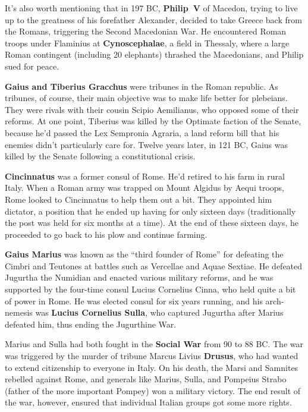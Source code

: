 It's also worth mentioning that in 197 BC, \textbf{Philip~V} of Macedon,
trying to live up to the greatness of his forefather Alexander,
decided to take Greece back from the Romans,
triggering the Second Macedonian War.
He encountered Roman troops under Flaminius at \textbf{Cynoscephalae}, a field in Thessaly,
where a large Roman contingent (including 20 elephants) thrashed the Macedonians,
and Philip sued for peace.

\textbf{Gaius and Tiberius Gracchus} were tribunes in the Roman republic.
As tribunes, of course, their main objective was to make life better for plebeians.
They were rivals with their cousin Scipio Aemilianus, who opposed some of their reforms.
At one point, Tiberius was killed by the Optimate faction of the Senate,
because he'd passed the Lex Sempronia Agraria,
a land reform bill that his enemies didn't particularly care for.
Twelve years later, in 121 BC, Gaius was killed by the Senate following a constitutional crisis.

\textbf{Cincinnatus} was a former consul of Rome.
He'd retired to his farm in rural Italy.
When a Roman army was trapped on Mount Algidus by Aequi troops,
Rome looked to Cincinnatus to help them out a bit.
They appointed him dictator, a position that he ended up having for only sixteen days
(traditionally the post was held for six months at a time).
At the end of these sixteen days, he proceeded to go back to his plow and continue farming.

\textbf{Gaius Marius} was known as the ``third founder of Rome''
for defeating the Cimbri and Teutones at battles such as Vercellae and Aquae Sextiae.
He defeated Jugurtha the Numidian and enacted various military reforms,
and he was supported by the four-time consul Lucius Cornelius Cinna,
who held quite a bit of power in Rome.
He was elected consul for six years running, and his arch-nemesis was
\textbf{Lucius Cornelius Sulla}, who captured Jugurtha after Marius defeated him,
thus ending the Jugurthine War.

Marius and Sulla had both fought in the \textbf{Social War} from 90 to 88 BC\@.
The war was triggered by the murder of tribune Marcus Livius \textbf{Drusus},
who had wanted to extend citizenship to everyone in Italy.
On his death, the Marsi and Samnites rebelled against Rome,
and generals like Marius, Sulla, and Pompeius Strabo (father of the more important Pompey)
won a military victory.
The end result of the war, however, ensured that individual Italian groups got some more rights.

